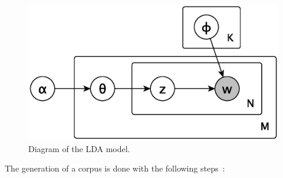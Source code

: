 \begin{figure}[!ht]
\includegraphics[scale=0.7]{figures/lda-generative-process.eps}
\caption{Diagram of the LDA model.}\label{fig:lda_gen_process}
\end{figure}

The generation of a corpus is done with the following steps~\cite{crain2012dimensionality, blei2003latent}:

